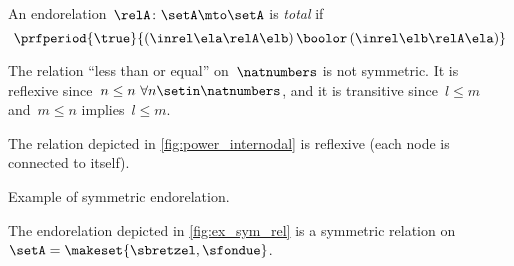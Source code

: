 \begin{ctdefinition}
    \label{def:endo_total}
    An endorelation~$\relA\colon \setA\mto \setA$ is \emph{total} if
    \begin{equation}
        \prfperiod{
            \true
        }{
            (\inrel\ela\relA\elb )\,\boolor\, (\inrel\elb\relA\ela)
        }
    \end{equation}
\end{ctdefinition}

\begin{example}
    The relation ``less than or equal'' on~$\natnumbers$ is not symmetric.
    It is reflexive since~$n\leq n \ \forall n\setin \natnumbers$, and it is transitive since~$l\leq m$ and~$m\leq n$ implies~$l\leq m$.
\end{example}

\begin{example}
    The relation depicted in \vref{fig:power_internodal} is reflexive (each node is connected to itself).
\end{example}
\begin{marginfigure}
    \centering
    \caption{Example of symmetric endorelation.}
    \label{fig:ex_sym_rel}
\end{marginfigure}
\begin{example}
    The endorelation depicted in \vref{fig:ex_sym_rel} is a symmetric relation on~$\setA=\makeset{\sbretzel,\sfondue}$.
\end{example}

